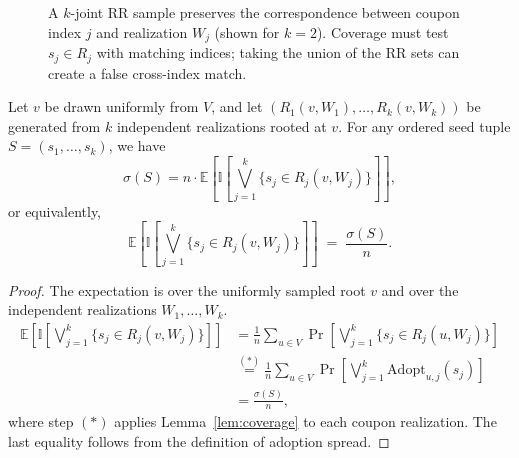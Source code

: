 \documentclass[sigconf,balance=false]{acmart}
\newcommand{\E}{\mathbb{E}}
\newcommand{\I}{\mathbb{I}}
\begin{document}
\begin{figure}[t]
  \caption{A $k$-joint RR sample preserves the correspondence between
  coupon index $j$ and realization $W_j$ (shown for $k=2$).
  Coverage must test $s_j\in R_j$ with matching indices; taking the
  union of the RR sets can create a false cross-index match.}
  \label{fig:joint-rr}
\end{figure}

\begin{lemma}[Unbiasedness]
\label{lem:unbiased}
Let $v$ be drawn uniformly from $V$, and let
$(R_1(v, W_1), \ldots, R_k(v, W_k))$ be generated from $k$ independent
realizations rooted at $v$.
For any ordered seed tuple $S=(s_1,\ldots,s_k)$, we have
\[
  \sigma(S)
  = n\cdot
  \E\!\left[
    \I\!\left[\bigvee_{j=1}^{k} \{s_j \in R_j(v,W_j)\}\right]
  \right],
\]
or equivalently,
\[
  \E\!\left[
    \I\!\left[\bigvee_{j=1}^{k} \{s_j \in R_j(v,W_j)\}\right]
  \right]
  \;=\; \frac{\sigma(S)}{n}.
\]
\end{lemma}

\begin{proof}
The expectation is over the uniformly sampled root $v$ and over the
independent realizations $W_1,\ldots,W_k$.
\begin{align*}
  \E\!\left[
    \I\!\left[\bigvee_{j=1}^k \{s_j \in R_j(v,W_j)\}\right]
  \right]
  &= \frac{1}{n}\sum_{u\in V}
     \Pr\!\left[\bigvee_{j=1}^k \{s_j \in R_j(u,W_j)\}\right] \\
  &\stackrel{(*)}{=}
     \frac{1}{n}\sum_{u\in V}
     \Pr\!\left[\bigvee_{j=1}^k \mathrm{Adopt}_{u,j}(s_j)\right] \\
  &= \frac{\sigma(S)}{n},
\end{align*}
where step $(*)$ applies Lemma~\ref{lem:coverage} to each coupon realization.
The last equality follows from the definition of adoption spread.
\end{proof}
\end{document}
